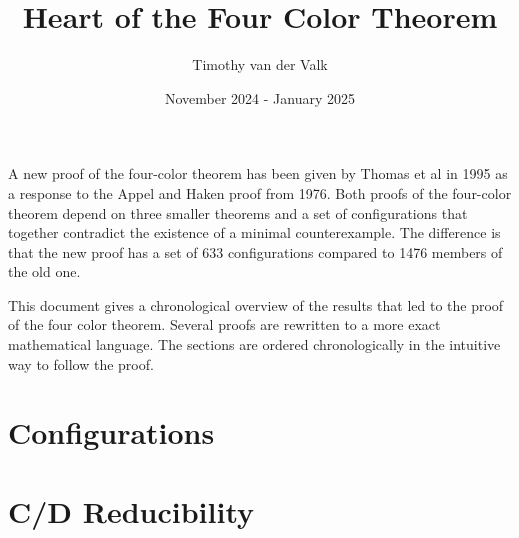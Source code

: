 \documentclass{article}
\title{Heart of the Four Color Theorem}
\author{Timothy van der Valk}
\date{November 2024 - January 2025}
\begin{document}
\maketitle

A new proof of the four-color theorem has been given by Thomas et al \cite{thomas} in 1995 as a response to the Appel and Haken proof from 1976. Both proofs of the four-color theorem depend on three smaller theorems and a set of configurations that together contradict the existence of a minimal counterexample. The difference is that the new proof has a set of 633 configurations compared to 1476 members of the old one.

This document gives a chronological overview of the results that led to the proof of the four color theorem. Several proofs are rewritten to a more exact mathematical language. The sections are ordered chronologically in the intuitive way to follow the proof.


\tableofcontents

\pagebreak




\section{Configurations}
\label{sec:config}

\section{C/D Reducibility}
\label{sec:reduce}

\pagebreak
\printbibliography
\end{document}
